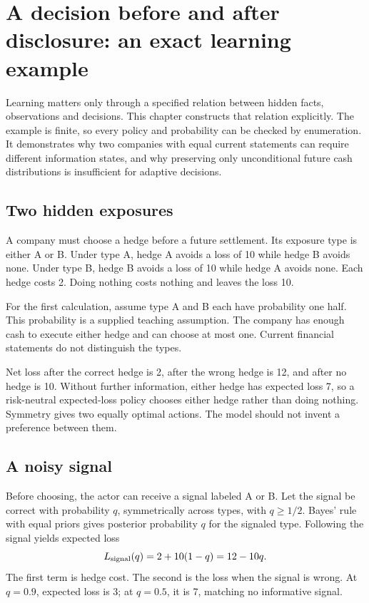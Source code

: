 \chapter[A decision before and after disclosure]{A decision before and after disclosure: an exact learning example}
\label{sim:learning-case}

Learning matters only through a specified relation between hidden facts, observations and decisions. This chapter constructs that relation explicitly. The example is finite, so every policy and probability can be checked by enumeration. It demonstrates why two companies with equal current statements can require different information states, and why preserving only unconditional future cash distributions is insufficient for adaptive decisions.

\section{Two hidden exposures}
A company must choose a hedge before a future settlement. Its exposure type is either A or B. Under type A, hedge A avoids a loss of 10 while hedge B avoids none. Under type B, hedge B avoids a loss of 10 while hedge A avoids none. Each hedge costs 2. Doing nothing costs nothing and leaves the loss 10.

For the first calculation, assume type A and B each have probability one half. This probability is a supplied teaching assumption. The company has enough cash to execute either hedge and can choose at most one. Current financial statements do not distinguish the types.

Net loss after the correct hedge is 2, after the wrong hedge is 12, and after no hedge is 10. Without further information, either hedge has expected loss 7, so a risk-neutral expected-loss policy chooses either hedge rather than doing nothing. Symmetry gives two equally optimal actions. The model should not invent a preference between them.

\section{A noisy signal}
Before choosing, the actor can receive a signal labeled A or B. Let the signal be correct with probability $q$, symmetrically across types, with $q\geq1/2$. Bayes' rule with equal priors gives posterior probability $q$ for the signaled type. Following the signal yields expected loss
\begin{equation}
 L_{\rm signal}(q)=2+10(1-q)=12-10q.
 \label{sim:signal-loss}
\end{equation}
The first term is hedge cost. The second is the loss when the signal is wrong. At $q=0.9$, expected loss is 3; at $q=0.5$, it is 7, matching no informative signal.

